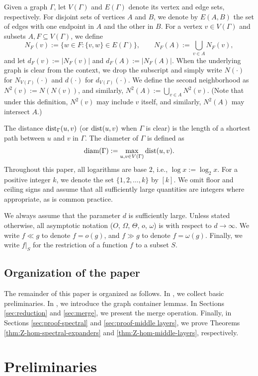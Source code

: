 \documentclass{amsart}
\theoremstyle{definition}
\newcommand{\0}[0]{\emptyset}
\newcommand{\dist}[0]{\mbox{\rm{dist}}}
\newcommand{\diam}[0]{\mbox{\rm{diam}}}
\begin{document}
Given a graph $\Gamma$, let $V(\Gamma)$ and $E(\Gamma)$ denote its vertex and edge sets, respectively. For disjoint sets of vertices $A$ and $B$, we denote by $E(A, B)$ the set of edges with one endpoint in $A$ and the other in $B$. For a vertex $v \in V(\Gamma)$ and subsets $A, F \subseteq V(\Gamma)$, we define
\[
    N_F(v) := \{w \in F : \{v,w\} \in E(\Gamma)\}, \qquad N_F(A) := \bigcup_{v \in A} N_F(v),
\]
and let $d_F(v) := |N_F(v)|$ and $d_F(A) := |N_F(A)|$. When the underlying graph is clear from the context, we drop the subscript and simply write $N(\cdot)$ for $N_{V(\Gamma)}(\cdot)$ and $d(\cdot)$ for $d_{V(\Gamma)}(\cdot)$.
We define the second neighborhood as $N^2(v) := N(N(v))$, and similarly, $N^2(A) := \bigcup_{v \in A} N^2(v)$. (Note that under this definition, $N^2(v)$ may include $v$ itself, and similarly, $N^2(A)$ may intersect $A$.)

The distance $\dist_\Gamma(u,v)$ (or $\dist(u,v)$ when $\Gamma$ is clear) is the length of a shortest path between $u$ and $v$ in $\Gamma$. The diameter of $\Gamma$ is defined as
\[
    \diam(\Gamma) := \max_{u,v \in V(\Gamma)} \dist(u,v).
\]
Throughout this paper, all logarithms are base $2$, i.e., $\log x := \log_2 x$. For a positive integer $k$, we denote the set $\{1, 2, \dots, k\}$ by $[k]$. We omit floor and ceiling signs and assume that all sufficiently large quantities are integers where appropriate, as is common practice.

We always assume that the parameter $d$ is sufficiently large. Unless stated otherwise, all asymptotic notation ($O$, $\Omega$, $\Theta$, $o$, $\omega$) is with respect to $d \rightarrow \infty$. We write $f \ll g$ to denote $f=o(g)$, and $f \gg g$ to denote $f=\omega(g)$. Finally, we write $f|_S$ for the restriction of a function $f$ to a subset $S$.

\subsection*{Organization of the paper}
The remainder of this paper is organized as follows. In , we collect basic preliminaries. In , we introduce the graph container lemmas. In Sections \ref{sec:reduction} and \ref{sec:merge}, we present the merge operation. Finally, in Sections \ref{sec:proof-spectral} and \ref{sec:proof-middle layers}, we prove Theorems \ref{thm:Z-hom-spectral-expanders} and \ref{thm:Z-hom-middle-layers}, respectively.


\section{Preliminaries}\label{sec:prelim}
\end{document}
